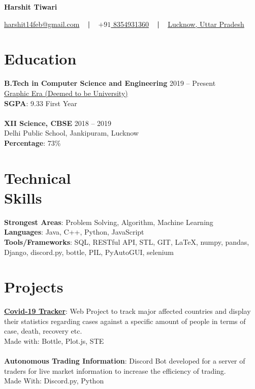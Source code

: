 \documentclass[margin, centered]{res}
\begin{document}
	\begin{center}
		\hspace{-\hoffset}
		\huge\bf{Harshit Tiwari}
	\end{center}
	\begin{center}
		\hspace{-\hoffset}
		\href{mailto:harshit14feb@gmail.com}{harshit14feb@gmail.com}
		~ \textbf{|} ~
		\href{tel:+919532655323}{\(+91\) 8354931360}
		~ \textbf{|} ~
		\href{https://goo.gl/maps/Sh5vC8Vo78Y3cWfr9}{Lucknow, Uttar Pradesh}
	\end{center}

	\begin{resume}
		\section{Education}
			\textbf{B.Tech in Computer Science and Engineering} \hfill 2019 – Present \\
			\href{https://www.geu.ac.in/}{Graphic Era (Deemed to be University)}\\
			\textbf{SGPA}: 9.33 First Year \\ 
			\\
			\textbf{XII Science, CBSE} \hfill 2018 – 2019 \\
			Delhi Public School, Jankipuram, Lucknow \\
			\textbf{Percentage}: 73\%
		
		\section{Technical \\ Skills}
			\textbf{Strongest Areas}: Problem Solving, Algorithm, Machine Learning\\
			\textbf{Languages}: Java, C++, Python, JavaScript\\
			\textbf{Tools/Frameworks}: SQL, RESTful API, STL, GIT, \LaTeX, numpy, pandas, Django, discord.py, bottle, PIL, PyAutoGUI, selenium

		
		\section{Projects}
			\textbf{\href{https://github.com/FireFeathers06/covid-19}{Covid-19 Tracker}}:
			Web Project to track major affected countries and display their statistics regarding 
			cases against a specific amount of people in terms of case, death, recovery etc.\\
			Made with: Bottle, Plot.js, STE
			\\ \\
			\textbf{Autonomous Trading Information}:
			Discord Bot developed for a server of traders for live market information to increase the efficiency of trading.\\
			Made With: Discord.py, Python
			\\ \\
		

\end{resume}
\end{document}
